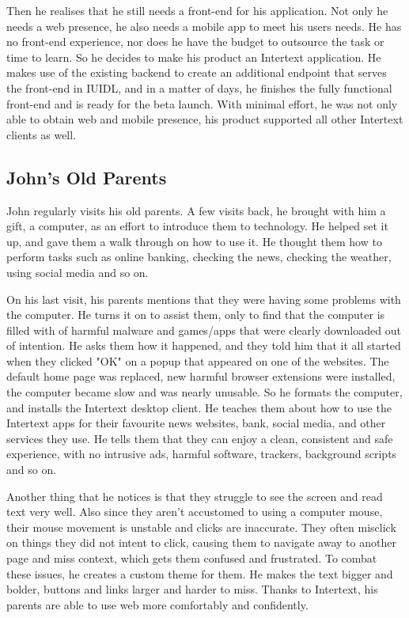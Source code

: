 Then he realises that he still needs a front-end for his application. Not only he needs a web presence, he also needs a mobile app to meet his users needs. He has no front-end experience, nor does he have the budget to outsource the task or time to learn. So he decides to make his product an Intertext application. He makes use of the existing backend to create an additional endpoint that serves the front-end in IUIDL, and in a matter of days, he finishes the fully functional front-end and is ready for the beta launch. With minimal effort, he was not only able to obtain web and mobile presence, his product supported all other Intertext clients as well.

\subsection{John's Old Parents}

John regularly visits his old parents. A few visits back, he brought with him a gift, a computer, as an effort to introduce them to technology. He helped set it up, and gave them a walk through on how to use it. He thought them how to perform tasks such as online banking, checking the news, checking the weather, using social media and so on. 

On his last visit, his parents mentions that they were having some problems with the computer. He turns it on to assist them, only to find that the computer is filled with of harmful malware and games/apps that were clearly downloaded out of intention. He asks them how it happened, and they told him that it all started when they clicked "OK" on a popup that appeared on one of the websites. The default home page was replaced, new harmful browser extensions were installed, the computer became slow and was nearly unusable. So he formats the computer, and installs the Intertext desktop client. He teaches them about how to use the Intertext apps for their favourite news websites, bank, social media, and other services they use. He tells them that they can enjoy a clean, consistent and safe experience, with no intrusive ads, harmful software, trackers, background scripts and so on. 

Another thing that he notices is that they struggle to see the screen and read text very well. Also since they aren't accustomed to using a computer mouse, their mouse movement is unstable and clicks are inaccurate. They often misclick on things they did not intent to click, causing them to navigate away to another page and miss context, which gets them confused and frustrated. To combat these issues, he creates a custom theme for them. He makes the text bigger and bolder, buttons and links larger and harder to miss. Thanks to Intertext, his parents are able to use web more comfortably and confidently.

